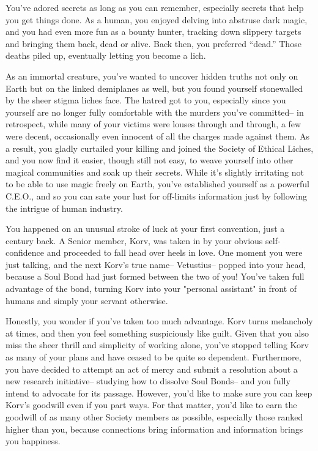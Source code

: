 \documentclass[char]{Sel}
\begin{document}
\name{\cLock{}}
You've adored secrets as long as you can remember, especially secrets that help you get things done. As a human, you enjoyed delving into abstruse dark magic, and you had even more fun as a bounty hunter, tracking down slippery targets and bringing them back, dead or alive. Back then, you preferred ``dead.'' Those deaths piled up, eventually letting you become a lich.

As an immortal creature, you've wanted to uncover hidden truths not only on Earth but on the linked demiplanes as well, but you found yourself stonewalled by the sheer stigma liches face. The hatred got to you, especially since you yourself are no longer fully comfortable with the murders you've committed-- in retrospect, while many of your victims were louses through and through, a few were decent, occasionally even innocent of all the charges made against them. As a result, you gladly curtailed your killing and joined the Society of Ethical Liches, and you now find it easier, though still not easy, to weave yourself into other magical communities and soak up their secrets. While it's slightly irritating not to be able to use magic freely on Earth, you've established yourself as a powerful C.E.O., and so you can sate your lust for off-limits information just by following the intrigue of human industry.

You happened on an unusual stroke of luck at your first convention, just a century back. A Senior member, Korv, was taken in by your obvious self-confidence and proceeded to fall head over heels in love. One moment you were just talking, and the next Korv’s true name-- Vetustius-- popped into your head, because a Soul Bond had just formed between the two of you! You've taken full advantage of the bond, turning Korv into your "personal assistant" in front of humans and simply your servant otherwise.

Honestly, you wonder if you've taken too much advantage. Korv turns melancholy at times, and then you feel something suspiciously like guilt. Given that you also miss the sheer thrill and simplicity of working alone, you've stopped telling Korv as many of your plans and have ceased to be quite so dependent. Furthermore, you have decided to attempt an act of mercy and submit a resolution about a new research initiative-- studying how to dissolve Soul Bonds-- and you fully intend to advocate for its passage. However, you'd like to make sure you can keep Korv's goodwill even if you part ways. For that matter, you'd like to earn the goodwill of as many other Society members as possible, especially those ranked higher than you, because connections bring information and information brings you happiness.
\end{document}
